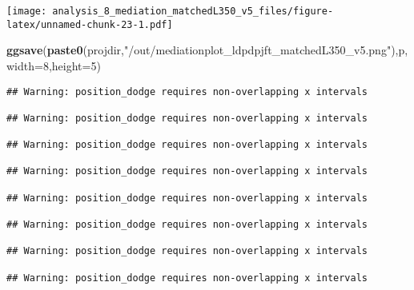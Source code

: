 \documentclass[
]{article}
\newenvironment{Shaded}{\begin{snugshade}}{\end{snugshade}}
\newcommand{\DataTypeTok}[1]{\textcolor[rgb]{0.13,0.29,0.53}{#1}}
\newcommand{\DecValTok}[1]{\textcolor[rgb]{0.00,0.00,0.81}{#1}}
\newcommand{\KeywordTok}[1]{\textcolor[rgb]{0.13,0.29,0.53}{\textbf{#1}}}
\newcommand{\NormalTok}[1]{#1}
\newcommand{\StringTok}[1]{\textcolor[rgb]{0.31,0.60,0.02}{#1}}
\begin{document}
\texttt{[image: analysis\_8\_mediation\_matchedL350\_v5\_files/figure-latex/unnamed-chunk-23-1.pdf]}

\begin{Shaded}
\begin{Highlighting}[]
\KeywordTok{ggsave}\NormalTok{(}\KeywordTok{paste0}\NormalTok{(projdir,}\StringTok{"/out/mediationplot_ldpdpjft_matchedL350_v5.png"}\NormalTok{),p,}\DataTypeTok{width=}\DecValTok{8}\NormalTok{,}\DataTypeTok{height=}\DecValTok{5}\NormalTok{)}
\end{Highlighting}
\end{Shaded}

\begin{verbatim}
## Warning: position_dodge requires non-overlapping x intervals

## Warning: position_dodge requires non-overlapping x intervals

## Warning: position_dodge requires non-overlapping x intervals

## Warning: position_dodge requires non-overlapping x intervals

## Warning: position_dodge requires non-overlapping x intervals

## Warning: position_dodge requires non-overlapping x intervals

## Warning: position_dodge requires non-overlapping x intervals

## Warning: position_dodge requires non-overlapping x intervals
\end{verbatim}
\end{document}
